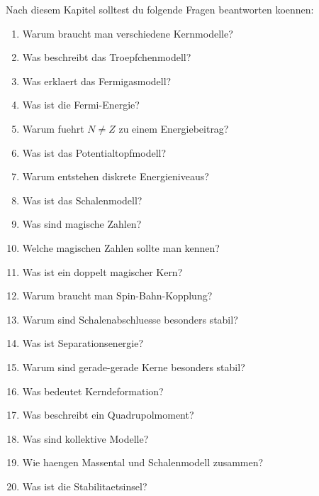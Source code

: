 \begin{examtipbox}
Nach diesem Kapitel solltest du folgende Fragen beantworten koennen:
\begin{enumerate}
    \item Warum braucht man verschiedene Kernmodelle?
    \item Was beschreibt das Troepfchenmodell?
    \item Was erklaert das Fermigasmodell?
    \item Was ist die Fermi-Energie?
    \item Warum fuehrt $N\neq Z$ zu einem Energiebeitrag?
    \item Was ist das Potentialtopfmodell?
    \item Warum entstehen diskrete Energieniveaus?
    \item Was ist das Schalenmodell?
    \item Was sind magische Zahlen?
    \item Welche magischen Zahlen sollte man kennen?
    \item Was ist ein doppelt magischer Kern?
    \item Warum braucht man Spin-Bahn-Kopplung?
    \item Warum sind Schalenabschluesse besonders stabil?
    \item Was ist Separationsenergie?
    \item Warum sind gerade-gerade Kerne besonders stabil?
    \item Was bedeutet Kerndeformation?
    \item Was beschreibt ein Quadrupolmoment?
    \item Was sind kollektive Modelle?
    \item Wie haengen Massental und Schalenmodell zusammen?
    \item Was ist die Stabilitaetsinsel?
\end{enumerate}
\end{examtipbox}